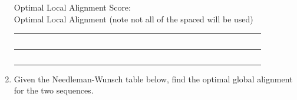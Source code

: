 \documentclass[11pt, oneside]{article}   	%
\begin{document}
\begin{enumerate}
Optimal Local Alignment Score: \\[3em]
Optimal Local Alignment (note not all of the spaced will be used)\\
{
\Huge
\begin{tabular}{|c|c|c|c|c|c|c|c|c|c|c|c|c|c|c|c|c|c|c|}
\hline
~ & ~ & ~ & ~ & ~ & ~ & ~ & ~ & ~ & ~ & ~ & ~ & ~ & ~ & ~ & ~ & ~ & ~ & ~ \\
\hline
~ & ~ & ~ & ~ & ~ & ~ & ~ & ~ & ~ & ~ & ~ & ~ & ~ & ~ & ~ & ~ & ~ & ~ & ~ \\
\hline 
\end{tabular}
}
\clearpage
\item Given the Needleman-Wunsch table below, find the optimal global alignment for the two sequences. 

{\footnotesize
\begin{tabular}{|c||c|c|c|c|c|c|c|c|c|c|c|c|}


\end{tabular}}
\end{enumerate}
\end{document}
